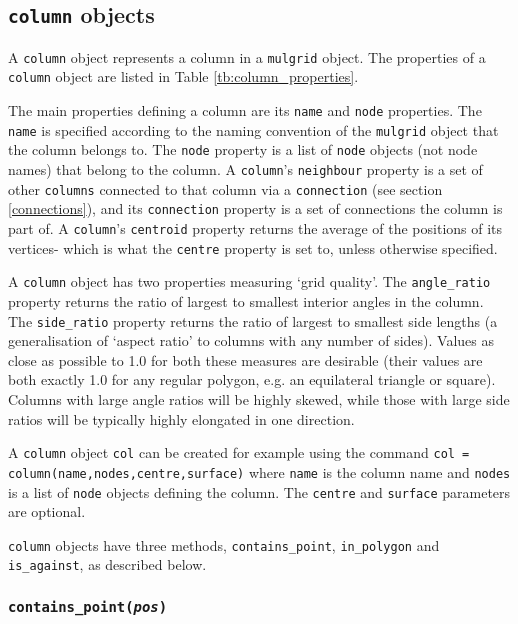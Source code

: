 \subsection{\texttt{column} objects}
\label{columnobjects}

A \texttt{column} object represents a column in a \texttt{mulgrid} object.  The properties of a \texttt{column} object are listed in Table \ref{tb:column_properties}.

The main properties defining a column are its \texttt{name} and \texttt{node} properties.  The \texttt{name} is specified according to the naming convention of the \texttt{mulgrid} object that the column belongs to.  The \texttt{node} property is a list of \texttt{node} objects (not node names) that belong to the column.  A \texttt{column}'s \texttt{neighbour} property is a set of other \texttt{columns} connected to that column via a \texttt{connection} (see section \ref{connections}), and its \texttt{connection} property is a set of connections the column is part of.  A \texttt{column}'s \texttt{centroid} property returns the average of the positions of its vertices- which is what the \texttt{centre} property is set to, unless otherwise specified.

A \texttt{column} object has two properties measuring `grid quality'.  The \texttt{angle\_ratio} property returns the ratio of largest to smallest interior angles in the column.  The \texttt{side\_ratio} property returns the ratio of largest to smallest side lengths (a generalisation of `aspect ratio' to columns with any number of sides).  Values as close as possible to 1.0 for both these measures are desirable (their values are both exactly 1.0 for any regular polygon, e.g. an equilateral triangle or square).  Columns with large angle ratios will be highly skewed, while those with large side ratios will be typically highly elongated in one direction.

A \texttt{column} object \texttt{col} can be created for example using the command \texttt{col = column(name,nodes,centre,surface)} where \texttt{name} is the column name and \texttt{nodes} is a list of \texttt{node} objects defining the column.  The \texttt{centre} and \texttt{surface} parameters are optional.

\texttt{column} objects have three methods, \texttt{contains\_point}, \texttt{in\_polygon} and \texttt{is\_against}, as described below.

\subsubsection{\texttt{contains\_point(\emph{pos})}}

